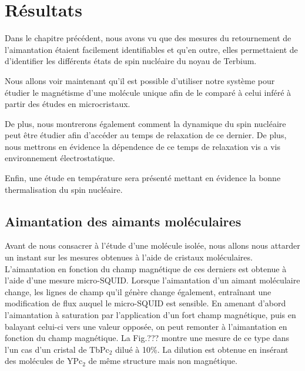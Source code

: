 \chapter{Résultats}

Dans le chapitre précédent, nous avons vu que des mesures du retournement de l'aimantation étaient facilement identifiables et qu'en outre, elles permettaient de d'identifier les différents états de spin nucléaire du noyau de Terbium.

Nous allons voir maintenant qu'il est possible d'utiliser notre système pour étudier le magnétisme d'une molécule unique afin de le comparé à celui inféré à partir des études en microcristaux. 

De plus, nous montrerons également comment la dynamique du spin nucléaire peut être étudier afin d'accéder au temps de relaxation de ce dernier. De plus, nous mettrons en évidence la dépendence de ce temps de relaxation vis a vis environnement  électrostatique.


Enfin, une étude en température sera présenté mettant en évidence la bonne thermalisation du spin nucléaire.

\section{Aimantation des aimants moléculaires}
Avant de nous consacrer à l'étude d'une molécule isolée, nous allons nous attarder un instant sur les mesures obtenues à l'aide de cristaux moléculaires. L'aimantation en fonction du champ magnétique de ces derniers est obtenue à l'aide d'une mesure micro-SQUID. Lorsque l'aimantation d'un aimant moléculaire change, les lignes de champ qu'il génère change également, entraînant une modification de flux auquel le micro-SQUID est sensible. En amenant d'abord l'aimantation à saturation par l'application d'un fort champ magnétique, puis en balayant celui-ci vers une valeur opposée, on peut remonter à l'aimantation en fonction du champ magnétique. La Fig.??? montre une mesure de ce type dans l'un cas d'un cristal de TbPc$_2$ dilué à 10\%. La dilution est obtenue en insérant des molécules de YPc$_2$ de même structure mais non magnétique.

